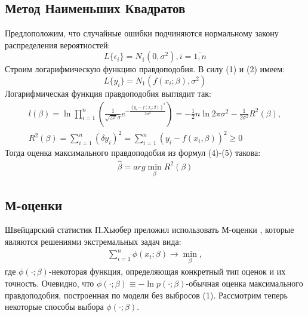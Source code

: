 \documentclass[12pt]{article}
\begin{document}
\subsection{Метод Наименьших Квадратов}
Предлоположим, что случайные ошибки подчиняются нормальному закону распределения вероятностей:
\begin{equation}
    L\{\epsilon_i\}=N_1(0,\sigma^2), i = \overline{1,n}
\end{equation}
Строим логарифмическую функцию правдоподобия. В силу (1) и (2) имеем:
\begin{equation}
    L\{y_i\}=N_1(f(x_i;\beta), \sigma^2)
\end{equation}
Логарифмическая функция правдоподобия выглядит так\cite{Kharin}:
\begin{eqnarray}
    l(\beta)=\ln \prod_{i=1}^{n}(\frac{1}{\sqrt{2\pi}\sigma}e^{-\frac{(y_i-f(x_i;\beta))^2}{2\sigma^2}})=-\frac{1}{2}n\ln{2\pi\sigma^2}-\frac{1}{2\sigma^2}R^2(\beta),\\
    R^2(\beta)=\sum_{i=1}^{n}(\delta y_i)^2=\sum_{i=1}^{n}(y_i-f(x_i,\beta))^2\geq 0
\end{eqnarray}
Тогда оценка максимального правдоподобия из формул (4)-(5) такова:
\begin{eqnarray}
    \hat{\beta}=arg \min_{\beta}R^2(\beta)
\end{eqnarray}

\subsection{М-оценки}
Швейцарский статистик П.Хьюбер преложил использовать М-оценки \cite{Kharin}, которые являются решениями экстремальных задач вида:
\begin{eqnarray}
    \sum_{i=1}^{n}\phi(x_t;\beta)\rightarrow \min_{\beta},
\end{eqnarray}
где $\phi(\cdot;\beta)$-некоторая функция, определяющая конкретный тип оценок и их точность.\hfill\break
Очевидно, что $\phi(\cdot;\beta)\equiv - \ln{p(\cdot;\beta)}$-обычная оценка максимального правдоподобия, построенная по модели без выбросов (1).\hfill\break
Рассмотрим теперь некоторые способы выбора $\phi(\cdot;\beta)$.\hfill\break
\end{document}
